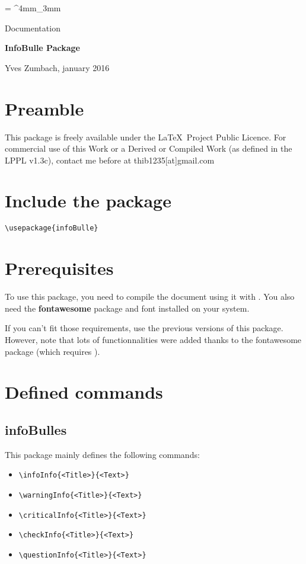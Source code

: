\documentclass[a4paper, 11pt, oneside, fleqn]{article}
\newcommand{\inColor}[1]{{\bfseries\color{mainColor}#1}}
\newcommand{\myTitle}{\inColor{\fontsize{1.3cm}{1em}\selectfont InfoBulle Package}}
\begin{document}
\everyrow{\tabucline[.4mm  white]{}}
\tabulinesep = ^4mm_3mm


\hfill
\begin{minipage}{\widthof{\myTitle}}
	{\fontsize{.6cm}{1em}\selectfont\color{mainColor}
		Documentation
	}
	\begin{spacing}{3}
		\myTitle
	\end{spacing}
	\vspace*{-10mm}
	\begin{flushright}
		Yves Zumbach, january 2016
	\end{flushright}
\end{minipage}

\newpage

\section{Preamble}
This package is freely available under the \LaTeX\ Project Public Licence. For commercial use of this Work or a Derived or Compiled Work (as defined in the LPPL v1.3c), contact me before at thib1235[at]gmail.com

\section{Include the package}
\lstinline|\usepackage{infoBulle}|

\section{Prerequisites}
To use this package, you need to compile the document using it with \inColor{\XeLaTeX}. You also need the \inColor{fontawesome} package and font installed on your system.

If you can't fit those requirements, use the previous versions of this package. However, note that lots of functionnalities were added thanks to the fontawesome package (which requires \XeLaTeX).


\section{Defined commands}
\subsection{infoBulles}
This package mainly defines the following commands:
\begin{itemize}
	\item \verb|\infoInfo{<Title>}{<Text>}|
	\item \verb|\warningInfo{<Title>}{<Text>}|
	\item \verb|\criticalInfo{<Title>}{<Text>}|
	\item \verb|\checkInfo{<Title>}{<Text>}|
	\item \verb|\questionInfo{<Title>}{<Text>}|
\end{itemize}
\end{document}
